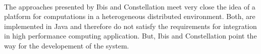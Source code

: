 \paragraph*{}
The approaches presented by Ibis and Constellation meet very close the
idea of a platform for computations in a heterogeneous distributed
environment. Both, are implemented in Java and therefore do not
satisfy the requirements for integration in high performance computing
application. But, Ibis and Constellation point the way for the
developement of the system.


\cleardoublepage

